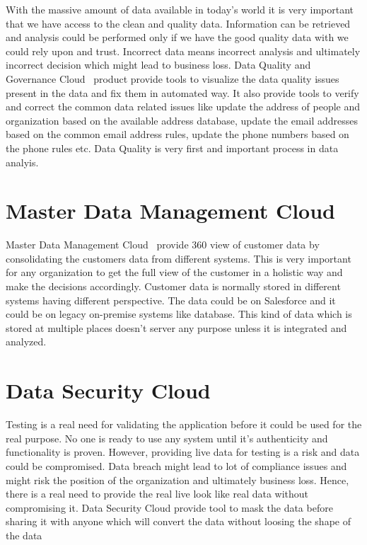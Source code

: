 With the massive amount of data available in today's world it is very
important that we have access to the clean and quality data. Information can be
retrieved and analysis could be performed only if we have the good
quality data with we could rely upon and trust. Incorrect data means incorrect analysis and ultimately incorrect decision which might lead to business loss. Data Quality and
Governance Cloud~\cite{hid-sp18-511-iics} product provide tools to
visualize the data quality issues present in the data and fix them in automated way. It
also provide tools to verify and correct the common data related
issues like update the address of people and organization based on the
available address database, update the email addresses based on the
common email address rules, update the phone numbers based on the phone rules etc. Data Quality is very first and important process in data analyis.

\section{Master Data Management Cloud}
Master Data Management Cloud~\cite{hid-sp18-511-iics} provide 360 view
of customer data by consolidating the customers data from different
systems. This is very important for any organization to get the full view of the customer in a holistic way and make the decisions accordingly. Customer data is normally stored in different systems having different perspective. The data could be on Salesforce\cite{hid-sp18-511-salesforce} and it could be on legacy on-premise systems like database. This kind of data which is stored at multiple places doesn't server any purpose unless it is integrated and analyzed.

\section{Data Security Cloud}
Testing is a real need for validating the application before it could be used for the real purpose. No one is ready to use any system until it's authenticity and functionality is proven. However, providing
live data for testing is a risk and data could be
compromised. Data breach might lead to lot of compliance issues and might risk the position of the organization and ultimately business loss. Hence, there is a real need to provide the real live look like real data without compromising it. Data Security Cloud\cite{hid-sp18-511-iics}
provide tool to mask the data before sharing it with anyone which
will convert the data without loosing the shape of the data

